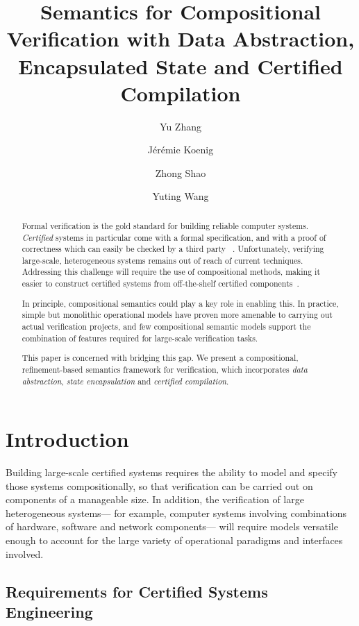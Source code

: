 \documentclass[acmsmall,screen,review,anonymous]{acmart}
\title{Semantics for Compositional Verification with
  Data Abstraction, Encapsulated State and Certified Compilation}
\author{Yu Zhang}
\affiliation{
  \institution{Yale University}
  \city{New Haven}
  \state{CT}
  \country{USA}}
\author{J\'er\'emie Koenig}
\affiliation{
  \institution{Yale University}
  \city{New Haven}
  \state{CT}
  \country{USA}}
\author{Zhong Shao}
\affiliation{
  \institution{Yale University}
  \city{New Haven}
  \state{CT}
  \country{USA}}
\author{Yuting Wang}
\affiliation{
  \institution{Shanghai Jiao Tong University}
  \city{Shanghai}
  \country{China}
}
\begin{document}
\newtheorem{remark}[theorem]{Remark}

\begin{abstract} %
Formal verification is the gold standard
for building reliable computer systems.
\emph{Certified} systems in particular
come with a formal specification,
and with a proof of correctness
which can easily be checked by a third party~%
\cite{shao10}.
Unfortunately, verifying large-scale, heterogeneous systems
remains out of reach of current techniques.
Addressing this challenge
will require the use of compositional methods,
making it easier to construct certified systems
from off-the-shelf certified components~\cite{deepspec}.

In principle,
compositional semantics
could play a key role in enabling this.
In practice, simple but monolithic operational models
have proven more amenable
to carrying out actual verification projects,
and few compositional semantic models
support the combination of features
required for large-scale verification tasks.

This paper is concerned with bridging this gap.
We present a compositional, refinement-based semantics framework for verification,
which incorporates
\emph{data abstraction},
\emph{state encapsulation} and
\emph{certified compilation}.
\end{abstract}


\maketitle

\section{Introduction} \label{sec:intro} %


Building large-scale certified systems
requires the ability
to model and specify those systems compositionally,
so that verification can be carried out
on components of a manageable size.
In addition,
the verification of large heterogeneous systems---%
for example,
computer systems involving combinations of
hardware, software and network components---%
will require models versatile enough
to account for the large variety of
operational paradigms and interfaces involved.


\subsection{Requirements for Certified Systems Engineering}
\end{document}
